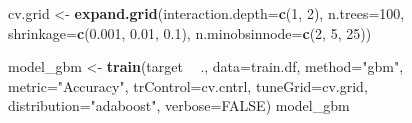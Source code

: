 \documentclass[
]{article}
\newenvironment{Shaded}{\begin{snugshade}}{\end{snugshade}}
\newcommand{\DataTypeTok}[1]{\textcolor[rgb]{0.13,0.29,0.53}{#1}}
\newcommand{\DecValTok}[1]{\textcolor[rgb]{0.00,0.00,0.81}{#1}}
\newcommand{\FloatTok}[1]{\textcolor[rgb]{0.00,0.00,0.81}{#1}}
\newcommand{\KeywordTok}[1]{\textcolor[rgb]{0.13,0.29,0.53}{\textbf{#1}}}
\newcommand{\NormalTok}[1]{#1}
\newcommand{\OperatorTok}[1]{\textcolor[rgb]{0.81,0.36,0.00}{\textbf{#1}}}
\newcommand{\OtherTok}[1]{\textcolor[rgb]{0.56,0.35,0.01}{#1}}
\newcommand{\StringTok}[1]{\textcolor[rgb]{0.31,0.60,0.02}{#1}}
\begin{document}
\begin{Shaded}
\begin{Highlighting}[]
\NormalTok{cv.grid <-}\StringTok{ }\KeywordTok{expand.grid}\NormalTok{(}\DataTypeTok{interaction.depth=}\KeywordTok{c}\NormalTok{(}\DecValTok{1}\NormalTok{, }\DecValTok{2}\NormalTok{),}
                       \DataTypeTok{n.trees=}\DecValTok{100}\NormalTok{,}
                       \DataTypeTok{shrinkage=}\KeywordTok{c}\NormalTok{(}\FloatTok{0.001}\NormalTok{, }\FloatTok{0.01}\NormalTok{, }\FloatTok{0.1}\NormalTok{),}
                       \DataTypeTok{n.minobsinnode=}\KeywordTok{c}\NormalTok{(}\DecValTok{2}\NormalTok{, }\DecValTok{5}\NormalTok{, }\DecValTok{25}\NormalTok{))}

\NormalTok{model_gbm <-}\StringTok{ }\KeywordTok{train}\NormalTok{(target }\OperatorTok{~}\StringTok{ }\NormalTok{., }\DataTypeTok{data=}\NormalTok{train.df,}
                  \DataTypeTok{method=}\StringTok{"gbm"}\NormalTok{,}
                  \DataTypeTok{metric=}\StringTok{"Accuracy"}\NormalTok{,}
                  \DataTypeTok{trControl=}\NormalTok{cv.cntrl,}
                  \DataTypeTok{tuneGrid=}\NormalTok{cv.grid,}
                  \DataTypeTok{distribution=}\StringTok{"adaboost"}\NormalTok{,}
                  \DataTypeTok{verbose=}\OtherTok{FALSE}\NormalTok{)}
\NormalTok{model_gbm}
\end{Highlighting}
\end{Shaded}
\end{document}
